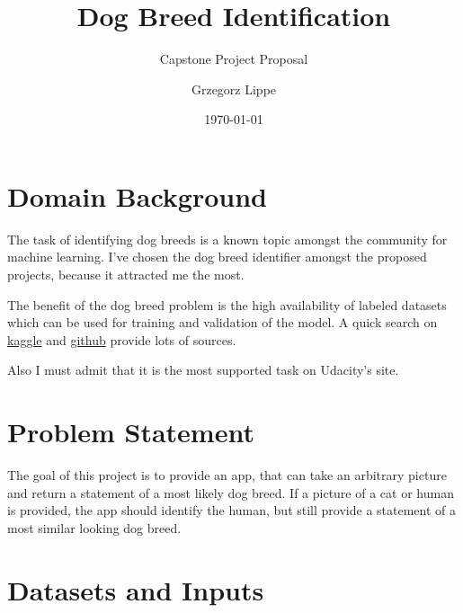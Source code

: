 \documentclass[paper=A4, DIV=10, parskip=half]{scrartcl}
\title{Dog Breed Identification}
\subtitle{Capstone Project Proposal}
\author{Grzegorz Lippe}
\date{\today}
\begin{document}
\maketitle

\section*{Domain Background}

The task of identifying dog breeds is a known topic amongst the community for machine
learning. I've chosen the dog breed identifier amongst the proposed projects, because it
attracted me the most.

The benefit of the dog breed problem is the high availability of labeled datasets which
can be used for training and validation of the model. A quick search on
\href{https://www.kaggle.com/c/dog-breed-identification/notebooks}{kaggle} and
\href{https://github.com/search?q=dog+breed}{github} provide lots of sources.

Also I must admit that it is the most supported task on Udacity's site.


\section*{Problem Statement}

The goal of this project is to provide an app, that can take an arbitrary picture and
return a statement of a most likely dog breed. If a picture of a cat or human is provided,
the app should identify the human, but still provide a statement of a most similar looking
dog breed.


\section*{Datasets and Inputs}
\end{document}
